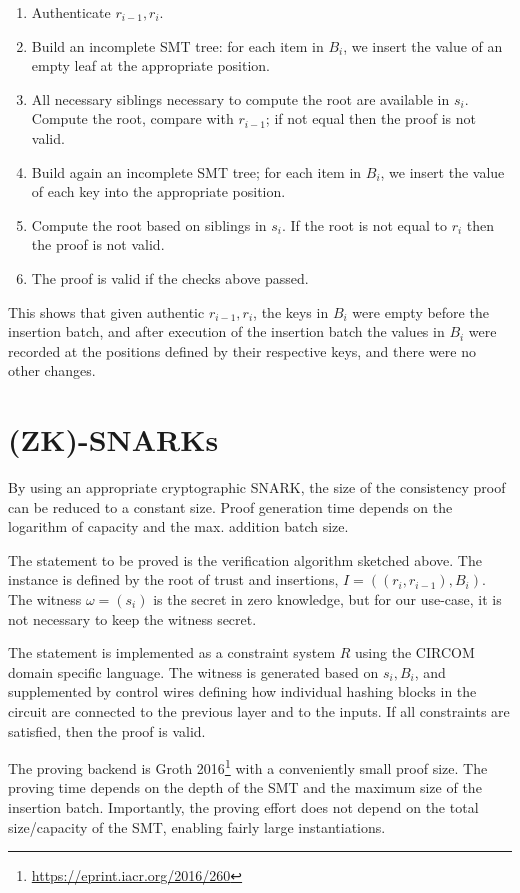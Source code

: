 \documentclass[twocolumn]{article}
\begin{document}
\begin{enumerate}
    \item Authenticate $r_{i-1}, r_i$.
    \item Build an incomplete SMT tree: for each item in $B_i$, we insert the value of an empty leaf at the appropriate position.
    \item All necessary siblings necessary to compute the root are available in $s_i$. Compute the root, compare with $r_{i-1}$; if not equal then the proof is not valid.
    \item Build again an incomplete SMT tree; for each item in $B_i$, we insert the value of each key into the appropriate position.
    \item Compute the root based on siblings in $s_i$. If the root is not equal to $r_i$ then the proof is not valid.
    \item The proof is valid if the checks above passed.
\end{enumerate}

This shows that given authentic $r_{i-1}, r_i$, the keys in $B_i$ were empty before the insertion batch, and after execution of the insertion batch the values in $B_i$ were recorded at the positions defined by their respective keys, and there were no other changes.


\section{(ZK)-SNARKs}

By using an appropriate cryptographic SNARK, the size of the consistency proof can be reduced to a constant size. Proof generation time depends on the logarithm of capacity and the max. addition batch size.

The statement to be proved is the verification algorithm sketched above. The instance is defined by the root of trust and insertions, $I = ((r_i, r_{i-1}),B_i)$. The witness $\omega = (s_i)$ is the secret in zero knowledge, but for our use-case, it is not necessary to keep the witness secret.

The statement is implemented as a constraint system $R$ using the CIRCOM domain specific language. The witness is generated based on $s_i, B_i$, and supplemented by control wires defining how individual hashing blocks in the circuit are connected to the previous layer and to the inputs. If all constraints are satisfied, then the proof is valid.

The proving backend is Groth 2016\footnote{\url{https://eprint.iacr.org/2016/260}} with a conveniently small proof size. The proving time depends on the depth of the SMT and the maximum size of the insertion batch. Importantly, the proving effort does not depend on the total size/capacity of the SMT, enabling fairly large instantiations.
\end{document}
